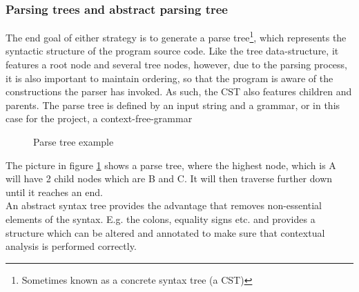 \subsubsection{Parsing trees and abstract parsing tree}
The end goal of either strategy is to generate a parse tree\footnote{Sometimes known as a concrete syntax tree (a CST)}, which represents the syntactic structure of the program source code. Like the tree data-structure, it features a root node and several tree nodes, however, due to the parsing process, it is also important to maintain ordering, so that the program is aware of the constructions the parser has invoked. As such, the CST also features children and parents. The parse tree is defined by an input string and a grammar, or in this case for the project, a context-free-grammar \\
\begin{figure}[H]
\centering
{}
\caption{Parse tree example}
\label{exampleparse}
\end{figure}
The picture in figure \ref{exampleparse} shows a parse tree, where the highest node, which is A will have 2 child nodes which are B and C. It will then traverse further down until it reaches an end. \\
An abstract syntax tree provides the advantage that removes non-essential elements of the syntax. E.g. the colons, equality signs etc. and provides a structure which can be altered and annotated to make sure that contextual analysis is performed correctly.
